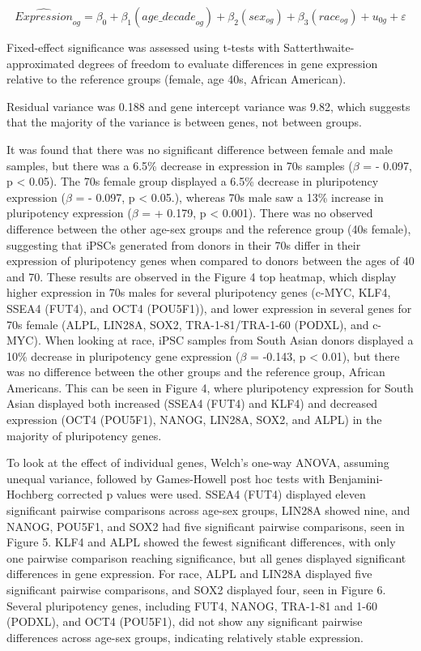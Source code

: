 \documentclass[
  letterpaper,
  DIV=11,
  numbers=noendperiod]{scrartcl}
\begin{document}
\[
\hat{Expression}_{og} = \beta_0 + \beta_1 ({age\_decade}_{og}) + \beta_2 ({sex}_{og} ) + \beta_3 ({race}_{og}) + u_{0g} + \varepsilon
\]

Fixed-effect significance was assessed using t-tests with
Satterthwaite-approximated degrees of freedom to evaluate differences in
gene expression relative to the reference groups (female, age 40s,
African American).

Residual variance was 0.188 and gene intercept variance was 9.82, which
suggests that the majority of the variance is between genes, not between
groups.

It was found that there was no significant difference between female and
male samples, but there was a 6.5\% decrease in expression in 70s
samples (\(\beta\) = - 0.097, p \textless{} 0.05). The 70s female group
displayed a 6.5\% decrease in pluripotency expression (\(\beta\) = -
0.097, p \textless{} 0.05.), whereas 70s male saw a 13\% increase in
pluripotency expression (\(\beta\) = + 0.179, p \textless{} 0.001).
There was no observed difference between the other age-sex groups and
the reference group (40s female), suggesting that iPSCs generated from
donors in their 70s differ in their expression of pluripotency genes
when compared to donors between the ages of 40 and 70. These results are
observed in the Figure 4 top heatmap, which display higher expression in
70s males for several pluripotency genes (c-MYC, KLF4, SSEA4 (FUT4), and
OCT4 (POU5F1)), and lower expression in several genes for 70s female
(ALPL, LIN28A, SOX2, TRA-1-81/TRA-1-60 (PODXL), and c-MYC). When looking
at race, iPSC samples from South Asian donors displayed a 10\% decrease
in pluripotency gene expression (\(\beta\) = -0.143, p \textless{}
0.01), but there was no difference between the other groups and the
reference group, African Americans. This can be seen in Figure 4, where
pluripotency expression for South Asian displayed both increased (SSEA4
(FUT4) and KLF4) and decreased expression (OCT4 (POU5F1), NANOG, LIN28A,
SOX2, and ALPL) in the majority of pluripotency genes.

To look at the effect of individual genes, Welch's one-way ANOVA,
assuming unequal variance, followed by Games-Howell post hoc tests with
Benjamini-Hochberg corrected p values were used. SSEA4 (FUT4) displayed
eleven significant pairwise comparisons across age-sex groups, LIN28A
showed nine, and NANOG, POU5F1, and SOX2 had five significant pairwise
comparisons, seen in Figure 5. KLF4 and ALPL showed the fewest
significant differences, with only one pairwise comparison reaching
significance, but all genes displayed significant differences in gene
expression. For race, ALPL and LIN28A displayed five significant
pairwise comparisons, and SOX2 displayed four, seen in Figure 6. Several
pluripotency genes, including FUT4, NANOG, TRA-1-81 and 1-60 (PODXL),
and OCT4 (POU5F1), did not show any significant pairwise differences
across age-sex groups, indicating relatively stable expression.
\end{document}
